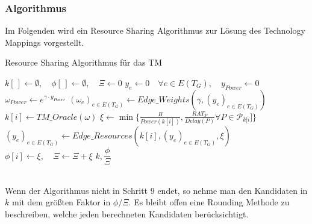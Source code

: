 \documentclass[11pt, a4paper, german]{article}
\begin{document}
\subsubsection{Algorithmus}
Im Folgenden wird ein Resource Sharing Algorithmus zur Lösung des Technology Mappings vorgestellt. \\

\LinesNumbered
\begin{algorithm}[H]
\DontPrintSemicolon
\caption{Resource Sharing Algorithmus für das TM}

   $k[\,] \gets \emptyset, \quad \phi[\,] \gets \emptyset, \quad \Xi \gets 0 $\;
  $y_e \gets 0 \quad \forall e \in E(T_G), \quad y_{Power} \gets 0$\;
     {
        $\omega_{Power} \gets e^{\gamma \cdot y_{Power}}$\;
        $(\omega_e)_{e \in E(T_G)} \gets Edge\_Weights(\gamma, (y_e)_{e \in E(T_G)})$\;
        $k[i] \gets TM\_Oracle(\omega)$\;
        $\xi \gets \min \{ \frac{B}{Power(k[i])}, \frac{RAT_P}{Delay(P)} \forall P \in \mathcal{P}_{k[i}] \}$\;
        $(y_e)_{e \in E(T_G)} \gets Edge\_Resources(k[i], (y_e)_{e \in E(T_G)}, \xi)$\;
        $\phi[i] \gets \xi, \quad \Xi \gets \Xi + \xi$
     }
     \Return $k,\dfrac{\phi}{\Xi}$
\end{algorithm}\ \\

Wenn der Algorithmus nicht in Schritt 9 endet, so nehme man den Kandidaten in $k$ mit dem größten Faktor in ${\phi}/{\Xi}$. Es bleibt offen eine Rounding Methode zu beschreiben, welche jeden berechneten Kandidaten berücksichtigt.
\end{document}
